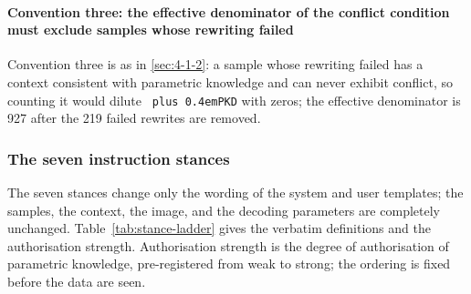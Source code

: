 \documentclass[pdflatex,sn-basic,Numbered]{sn-jnl}
\theoremstyle{thmstyleone}
\theoremstyle{thmstyletwo}
\theoremstyle{thmstylethree}
\DeclareRobustCommand{\code}[1]{\texttt{\spaceskip=0pt plus 0.4em\relax#1}}
\begin{document}
\paragraph{Convention three: the effective denominator of the conflict condition must exclude samples whose rewriting failed}
\label{sec:x79bdc073bc}

Convention three is as in \ref{sec:4-1-2}: a sample whose rewriting failed has a context consistent
with parametric knowledge and can never exhibit conflict, so counting it would dilute \code{PKD} with
zeros; the effective denominator is 927 after the 219 failed rewrites are removed.

\subsubsection{The seven instruction stances}
\label{sec:4-3-2}

The seven stances change only the wording of the system and user templates; the samples, the
context, the image, and the decoding parameters are completely unchanged.
Table~\ref{tab:stance-ladder} gives the verbatim definitions and the authorisation strength.
Authorisation strength is the degree of authorisation of parametric knowledge, pre-registered
from weak to strong; the ordering is fixed before the data are seen.
\end{document}
